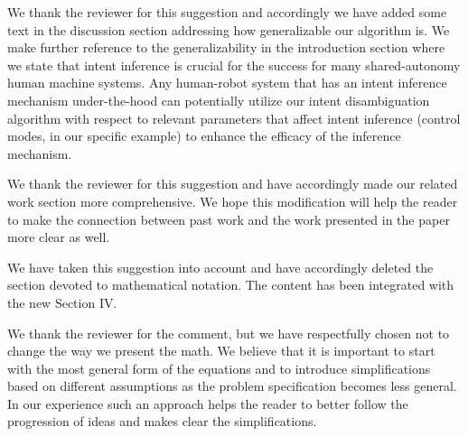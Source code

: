 \documentclass[a4paper,twoside,11pt]{reviewresponse}
\begin{document}
We thank the reviewer for this suggestion and accordingly we have added some text in the discussion section addressing how generalizable our algorithm is. We make further reference to the generalizability in the introduction section where we state that intent inference is crucial for the success for many shared-autonomy human machine systems. Any human-robot system that has an intent inference mechanism under-the-hood can potentially utilize our intent disambiguation algorithm with respect to relevant parameters that affect intent inference (control modes, in our specific example) to enhance the efficacy of the inference mechanism.

We thank the reviewer for this suggestion and have accordingly made our related work section more comprehensive. We hope this modification will help the reader to make the connection between past work and the work presented in the paper more clear as well.


We have taken this suggestion into account and have accordingly deleted the section devoted to mathematical notation. The content has been integrated with the new Section IV. 

We thank the reviewer for the comment, but we have respectfully chosen not to change the way we present the math. We believe that it is important to start with the most general form of 
the equations and to introduce simplifications based on different 
assumptions as the problem specification becomes less general. In our 
experience such an approach helps the reader to better follow the 
progression of ideas and makes clear the simplifications. 
\end{document}
